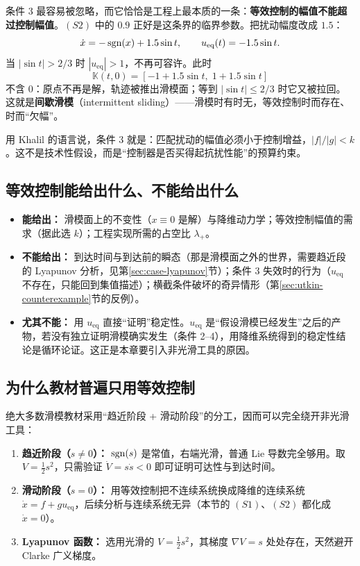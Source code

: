 条件 3 最容易被忽略，而它恰恰是工程上最本质的一条：\textbf{等效控制的幅值不能超过控制幅值}。$(S2)$ 中的 $0.9$ 正好是这条界的临界参数。把扰动幅度改成 $1.5$：
\[
\dot x=-\operatorname{sgn}(x)+1.5\sin t,\qquad u_\mathrm{eq}(t)=-1.5\sin t .
\]
当 $|\sin t|>2/3$ 时 $|u_\mathrm{eq}|>1$，不再可容许。此时
\[
\mathbb{K}(t,0)=[-1+1.5\sin t,\;1+1.5\sin t]
\]
不含 $0$：原点不再是解，轨迹被推出滑模面；等到 $|\sin t|\le2/3$ 时它又被拉回。这就是\textbf{间歇滑模}（intermittent sliding）——滑模时有时无，等效控制时而存在、时而“欠幅”。

用 Khalil 的语言说，条件 3 就是：匹配扰动的幅值必须小于控制增益，$|f|/|g|<k$ \cite[§14.1]{khalilNonlinearSystems}。这不是技术性假设，而是“控制器是否买得起抗扰性能”的预算约束。

\subsection{等效控制能给出什么、不能给出什么}

\begin{itemize}
  \item \textbf{能给出：} 滑模面上的不变性（$x\equiv0$ 是解）与降维动力学；等效控制幅值的需求（据此选 $k$）；工程实现所需的占空比 $\lambda_+$。
  \item \textbf{不能给出：} 到达时间与到达前的瞬态（那是滑模面之外的世界，需要趋近段的 Lyapunov 分析，见第\ref{sec:case-lyapunov}节）；条件 3 失效时的行为（$u_\mathrm{eq}$ 不存在，只能回到集值描述）；横截条件破坏的奇异情形（第\ref{sec:utkin-counterexample}节的反例）。
  \item \textbf{尤其不能：} 用 $u_\mathrm{eq}$ 直接“证明”稳定性。$u_\mathrm{eq}$ 是“假设滑模已经发生”之后的产物，若没有独立证明滑模确实发生（条件 2--4），用降维系统得到的稳定性结论是循环论证。这正是本章要引入非光滑工具的原因。
\end{itemize}

\subsection{为什么教材普遍只用等效控制}

绝大多数滑模教材采用“趋近阶段 + 滑动阶段”的分工，因而可以完全绕开非光滑工具：

\begin{enumerate}
  \item \textbf{趋近阶段（$s\neq0$）：} $\operatorname{sgn}(s)$ 是常值，右端光滑，普通 Lie 导数完全够用。取 $V=\tfrac12s^2$，只需验证 $\dot V=s\dot s<0$ 即可证明可达性与到达时间。
  \item \textbf{滑动阶段（$s=0$）：} 用等效控制把不连续系统换成降维的连续系统 $\dot x=f+gu_\mathrm{eq}$，后续分析与连续系统无异（本节的 $(S1)$、$(S2)$ 都化成 $\dot x=0$）。
  \item \textbf{Lyapunov 函数：} 选用光滑的 $V=\tfrac12s^2$，其梯度 $\nabla V=s$ 处处存在，天然避开 Clarke 广义梯度。
\end{enumerate}

